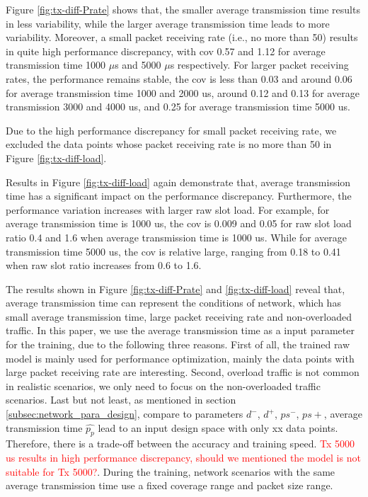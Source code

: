 Figure \ref{fig:tx-diff-Prate} shows that, the smaller average transmission time results in less variability, while the larger average transmission time leads to more variability. Moreover, a small packet receiving rate (i.e., no more than 50) results in quite high performance discrepancy, with \gls{cov} 0.57 and 1.12 for average transmission time 1000 $\mu$s and 5000 $\mu$s respectively. For larger packet receiving rates, the performance remains stable, the \gls{cov} is less than 0.03 and around 0.06 for average transmission time 1000 and 2000 us, around 0.12 and 0.13 for average transmission 3000 and 4000 us, and 0.25 for average transmission time 5000 us. 

Due to the high performance discrepancy for small packet receiving rate, we excluded the data points whose packet receiving rate is no more than 50 in Figure \ref{fig:tx-diff-load}. 

Results in Figure \ref{fig:tx-diff-load} again demonstrate that, average transmission time has a significant impact on the performance discrepancy. Furthermore, the performance variation increases with larger \gls{raw} slot load. 
For example, for average transmission time is 1000 us, the \gls{cov} is 0.009 and 0.05 for \gls{raw} slot load ratio 0.4 and 1.6 when average transmission time is 1000 us. 
While for average transmission time 5000 us, the \gls{cov} is relative large, ranging from 0.18 to 0.41 when \gls{raw} slot ratio increases from 0.6 to 1.6.



 The results shown in Figure \ref{fig:tx-diff-Prate} and  \ref{fig:tx-diff-load} reveal that, average transmission time can represent the conditions of network, which has small average transmission time, large packet receiving rate and non-overloaded traffic. In this paper, we use the average transmission time as a input parameter for the training, due to the following three reasons. First of all, the trained \gls{raw} model is mainly used for performance optimization, mainly the data points with large packet receiving rate are interesting. Second, overload traffic is not common in realistic scenarios, we only need to focus on the non-overloaded traffic scenarios. Last but not least, as mentioned in section \ref{subsec:network_para_design}, compare to parameters {${d^-}$, ${d^+}$, ${ps^-}$, ${ps+}$}, average transmission time $\hat{p_p}$ lead to an input design space with only xx data points. Therefore, there is a trade-off between the accuracy and training speed. \textcolor{red}{Tx 5000 us results in high performance discrepancy, should we mentioned the model is not suitable for Tx 5000?}. During the training, network scenarios with the same average transmission time use a fixed coverage range and packet size range. 

